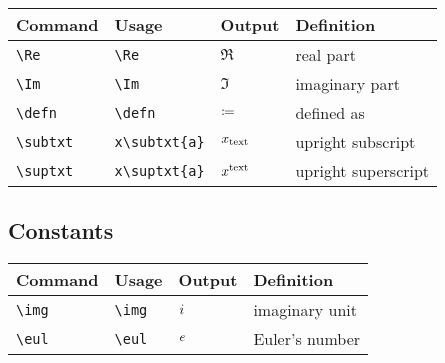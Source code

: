 \documentclass[11pt]{article}
\begin{document}
\begin{tabular}{llll}
    Command        & Usage              & Output           & Definition          \\
    \hline
    \verb|\Re|     & \verb|\Re|         & $\Re$            & real part           \\
    \verb|\Im|     & \verb|\Im|         & $\Im$            & imaginary part      \\
    \verb|\defn|   & \verb|\defn|       & $\coloneq$          & defined as          \\
    \verb|\subtxt| & \verb|x\subtxt{a}| & $x_{\mathrm{text}}$ & upright subscript   \\
    \verb|\suptxt| & \verb|x\suptxt{a}| & $x^{\mathrm{text}}$ & upright superscript \\
\end{tabular}

\subsection{Constants}

\begin{tabular}{llll}
    Command     & Usage       & Output & Definition     \\
    \hline
    \verb|\img| & \verb|\img| & $i$ & imaginary unit \\
    \verb|\eul| & \verb|\eul| & $e$ & Euler's number \\
\end{tabular}
\end{document}
